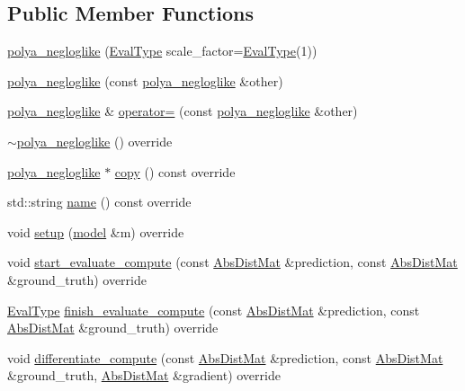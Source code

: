 \subsection*{Public Member Functions}
\begin{DoxyCompactItemize}
\item 
\hyperlink{classlbann_1_1polya__negloglike_a3f3c7f775d548ac8e011fb1b637804cb}{polya\+\_\+negloglike} (\hyperlink{base_8hpp_a3266f5ac18504bbadea983c109566867}{Eval\+Type} scale\+\_\+factor=\hyperlink{base_8hpp_a3266f5ac18504bbadea983c109566867}{Eval\+Type}(1))
\item 
\hyperlink{classlbann_1_1polya__negloglike_a35d76a08dea5203c4f70e48260adf1ec}{polya\+\_\+negloglike} (const \hyperlink{classlbann_1_1polya__negloglike}{polya\+\_\+negloglike} \&other)
\item 
\hyperlink{classlbann_1_1polya__negloglike}{polya\+\_\+negloglike} \& \hyperlink{classlbann_1_1polya__negloglike_a13d1e4b96c6e99bb39afc2b349ad9588}{operator=} (const \hyperlink{classlbann_1_1polya__negloglike}{polya\+\_\+negloglike} \&other)
\item 
\hyperlink{classlbann_1_1polya__negloglike_a0c00f1f9cac0b0c6a638b86e031768e3}{$\sim$polya\+\_\+negloglike} () override
\item 
\hyperlink{classlbann_1_1polya__negloglike}{polya\+\_\+negloglike} $\ast$ \hyperlink{classlbann_1_1polya__negloglike_a526b3229a4143359c041f8d88b0a729b}{copy} () const override
\item 
std\+::string \hyperlink{classlbann_1_1polya__negloglike_ab787129d7caa79b04b91a9660b31d3b8}{name} () const override
\item 
void \hyperlink{classlbann_1_1polya__negloglike_a4a7ae8eef1ef216f60b158acb1853355}{setup} (\hyperlink{classlbann_1_1model}{model} \&m) override
\item 
void \hyperlink{classlbann_1_1polya__negloglike_aea7e92b3d290f3d11b6f8c93f9f9d3e6}{start\+\_\+evaluate\+\_\+compute} (const \hyperlink{base_8hpp_a9a697a504ae84010e7439ffec862b470}{Abs\+Dist\+Mat} \&prediction, const \hyperlink{base_8hpp_a9a697a504ae84010e7439ffec862b470}{Abs\+Dist\+Mat} \&ground\+\_\+truth) override
\item 
\hyperlink{base_8hpp_a3266f5ac18504bbadea983c109566867}{Eval\+Type} \hyperlink{classlbann_1_1polya__negloglike_a81dbe71fef52ee0874549c4cf96c01e3}{finish\+\_\+evaluate\+\_\+compute} (const \hyperlink{base_8hpp_a9a697a504ae84010e7439ffec862b470}{Abs\+Dist\+Mat} \&prediction, const \hyperlink{base_8hpp_a9a697a504ae84010e7439ffec862b470}{Abs\+Dist\+Mat} \&ground\+\_\+truth) override
\item 
void \hyperlink{classlbann_1_1polya__negloglike_a95fea60663d86cab31d89531046cc32c}{differentiate\+\_\+compute} (const \hyperlink{base_8hpp_a9a697a504ae84010e7439ffec862b470}{Abs\+Dist\+Mat} \&prediction, const \hyperlink{base_8hpp_a9a697a504ae84010e7439ffec862b470}{Abs\+Dist\+Mat} \&ground\+\_\+truth, \hyperlink{base_8hpp_a9a697a504ae84010e7439ffec862b470}{Abs\+Dist\+Mat} \&gradient) override
\end{DoxyCompactItemize}
